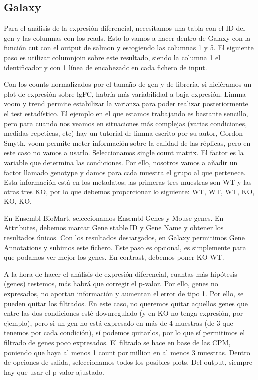 \subsection{Galaxy}
Para el análisis de la expresión diferencial, necesitamos una tabla con el ID del gen y las columnas con los reads. Esto lo vamos a hacer dentro de Galaxy con la función cut con el output de salmon y escogiendo las columnas 1 y 5. El siguiente paso es utilizar columnjoin sobre este resultado, siendo la columna 1 el identificador y con 1 línea de encabezado en cada fichero de input.

Con los counts normalizados por el tamaño de gen y de librería, si hiciéramos un plot de expresión sobre lgFC, habría más variabilidad a baja expresión. Limma-voom y trend permite estabilizar la varianza para poder realizar posteriormente el test estadístico. El ejemplo en el que estamos trabajando es bastante sencillo, pero para cuando nos veamos en situaciones más complejas (varias condiciones, medidas repeticas, etc) hay un tutorial de limma escrito por su autor, Gordon Smyth. voom permite meter información sobre la calidad de las réplicas, pero en este caso no vamos a usarlo. Seleccionamos single count matrix. El factor es la variable que determina las condiciones. Por ello, nosotros vamos a añadir un factor llamado genotype y damos para cada muestra el grupo al que pertenece. Esta información está en los metadatos; las primeras tres muestras son WT y las otras tres KO, por lo que debemos proporcionar lo siguiente: WT, WT, WT, KO, KO, KO. 

En Ensembl BioMart, seleccionamos Ensembl Genes y Mouse genes. En Attributes, debemos marcar Gene stable ID y Gene Name y obtener los resultados únicos. Con los resultados descargados, en Galaxy permitimos Gene Annotations y subimos este fichero. Este paso es opcional, es simplemente para que podamos ver mejor los genes. En contrast, debemos poner KO-WT.

A la hora de hacer el análisis de expresión diferencial, cuantas más hipótesis (genes) testemos, más habrá que corregir el p-valor. Por ello, genes no expresados, no aportan información y aumentan el error de tipo 1. Por ello, se pueden quitar los filtrados. En este caso, no queremos quitar aquellos genes que entre las dos condiciones esté downregulado (y en KO no tenga expresión, por ejemplo), pero si un gen no está expresado en más de 4 muestras (de 3 que tenemos por cada condición), sí podemos quitarlos, por lo que sí permitimos el filtrado de genes poco expresados. El filtrado se hace en base de las CPM, poniendo que haya al menos 1 count por million en al menos 3 muestras. Dentro de opciones de salida, seleccionamos todos los posibles plots. 
Del output, siempre hay que usar el p-valor ajustado. 

